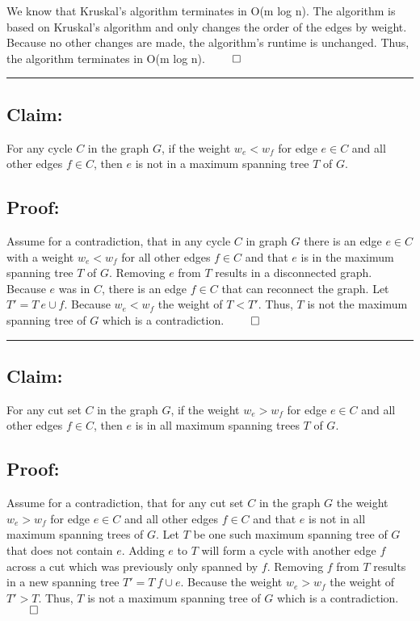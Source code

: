 \documentclass[11pt]{article}
\begin{document}
We know that Kruskal's algorithm terminates in O(m log n). The algorithm is based on Kruskal's algorithm and only changes the order of the edges by weight. Because no other changes are made, the algorithm's runtime is unchanged. Thus, the algorithm terminates in O(m log n). $\qed$

\noindent\textcolor[RGB]{220,220,220}{\rule{\linewidth}{0.8pt}}

\subsection*{Claim:}

For any cycle $C$ in the graph $G$, if the weight $w_e < w_f$ for edge $e \in C$ and all other edges $f \in C$, then $e$ is not in a maximum spanning tree $T$ of $G$. 

\subsection*{Proof:}

Assume for a contradiction, that in any cycle $C$ in graph $G$ there is an edge $e \in C$ with a weight $w_e < w_f$ for all other edges $f \in C$ and that $e$ is in the maximum spanning tree $T$ of $G$. Removing $e$ from $T$ results in a disconnected graph. Because $e$ was in $C$, there is an edge $f \in C$ that can reconnect the graph. Let $T' = T \ e \cup f$. Because $w_e < w_f$ the weight of $T < T'$. Thus, $T$ is not the maximum spanning tree of $G$ which is a contradiction. $\qed$

\noindent\textcolor[RGB]{220,220,220}{\rule{\linewidth}{0.8pt}}

\subsection*{Claim:}

For any cut set $C$ in the graph $G$, if the weight $w_e > w_f$ for edge $e \in C$ and all other edges $f \in C$, then $e$ is in all maximum spanning trees $T$ of $G$. 

\subsection*{Proof:}

Assume for a contradiction, that for any cut set $C$ in the graph $G$ the weight $w_e > w_f$ for edge $e \in C$ and all other edges $f \in C$ and that $e$ is not in all maximum spanning trees of $G$. Let $T$ be one such maximum spanning tree of $G$ that does not contain $e$. Adding $e$ to $T$ will form a cycle with another edge $f$ across a cut which was previously only spanned by $f$. Removing $f$ from $T$ results in a new spanning tree $T' = T \ f \cup e$. Because the weight $w_e > w_f$ the weight of $T' > T$. Thus, $T$ is not a maximum spanning tree of $G$ which is a contradiction. $\qed$
\end{document}

